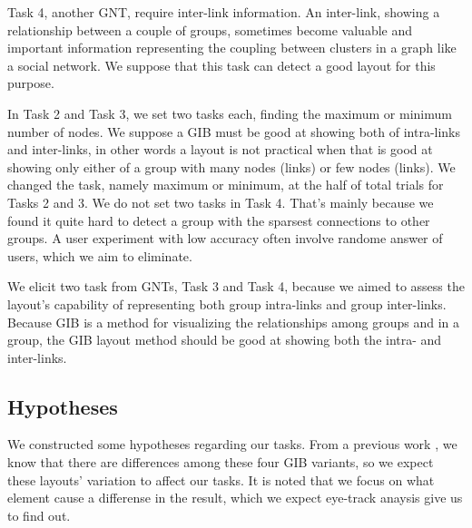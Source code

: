 \documentclass{vgtc}                          %
\begin{document}
Task 4, another GNT, require inter-link information.
An inter-link, showing a relationship between a couple of groups, sometimes become valuable and important information representing the coupling between clusters in a graph like a social network. We suppose that this task can detect a good layout for this purpose.

In Task 2 and Task 3, we set two tasks each, finding the maximum or minimum number of nodes.
We suppose a GIB must be good at showing both of intra-links and inter-links, in other words a layout is not practical when that is good at showing only either of a group with many nodes (links) or few nodes (links).
We changed the task, namely maximum or minimum, at the half of total trials for Tasks 2 and 3.
We do not set two tasks in Task 4. That's mainly because we found it quite hard to detect a group with the sparsest connections to other groups. A user experiment with low accuracy often involve randome answer of users, which we aim to eliminate.

We elicit two task from GNTs, Task 3 and Task 4, because we aimed to assess the layout's capability of representing both group intra-links and group inter-links.
Because GIB is a method for visualizing the relationships among groups and in a group, the GIB layout method should be good at showing both the intra- and inter-links.

\subsection{Hypotheses}
We constructed some hypotheses regarding our tasks.
From a previous work \cite{chaturvedi2014group}, we know that there are differences among these four GIB variants, so we expect these layouts' variation to affect our tasks. It is noted that we focus on what element cause a differense in the result, which we expect eye-track anaysis give us to find out.
\end{document}
